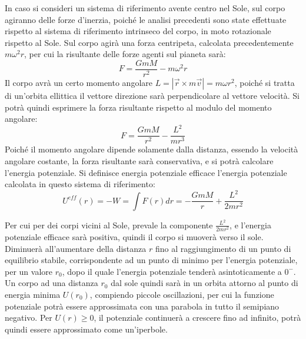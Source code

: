 \documentclass{article}
\numberwithin{equation}{subsection}
\begin{document}
In caso si consideri un sistema di riferimento avente centro nel Sole, sul corpo agiranno delle forze d'inerzia, poiché le analisi 
precedenti sono state effettuate rispetto al sistema di riferimento intrinseco del corpo, in moto rotazionale rispetto al Sole. Sul corpo agirà una forza centripeta, calcolata 
precedentemente $m\omega^2r$, per cui la risultante delle forze agenti sul pianeta sarà:
\begin{equation*}
    F=\displaystyle\frac{GmM}{r^2}-m\omega^2r
\end{equation*}
Il corpo avrà un certo momento angolare $L=|\vec{r}\times m\vec{v}|=m\omega r^2$, poiché si tratta di un'orbita ellittica il vettore direzione 
sarà perpendicolare al vettore velocità. Si potrà quindi esprimere la forza risultante rispetto al modulo del momento angolare:
\begin{equation*}
    F=\displaystyle\frac{GmM}{r^2}-\frac{L^2}{mr^3}
\end{equation*}
Poiché il momento angolare dipende solamente dalla distanza, essendo la velocità angolare costante, la forza risultante sarà conservativa, e si potrà 
calcolare l'energia potenziale. Si definisce energia potenziale efficace l'energia potenziale calcolata in questo sistema di riferimento:
\begin{equation}
    U^{eff}(r)=-W=\displaystyle\int F(r)dr=-\displaystyle\frac{GmM}{r}+\frac{L^2}{2mr^2}
\end{equation}

\begin{center}
\end{center}

Per cui per dei corpi vicini al Sole, prevale la componente $\displaystyle\frac{L^2}{2mr^2}$, e l'energia potenziale efficace sarà positiva, quindi 
il corpo si muoverà verso il sole. Diminuerà all'aumentare della distanza $r$ fino al raggiungimento di un punto di equilibrio stabile, corrispondente ad un punto 
di minimo per l'energia potenziale, per un valore 
$r_0$, dopo il quale l'energia potenziale tenderà asintoticamente a $0^-$. Un corpo ad una distanza $r_0$ dal sole quindi sarà in un orbita attorno al 
punto di energia minima $U(r_0)$, compiendo piccole oscillazioni, per cui la funzione potenziale potrà essere approssimata con una parabola in 
tutto il semipiano negativo. Per $U(r)\geq0$, il potenziale continuerà a crescere fino ad infinito, potrà quindi essere approssimato come un'iperbole. 
\end{document}
